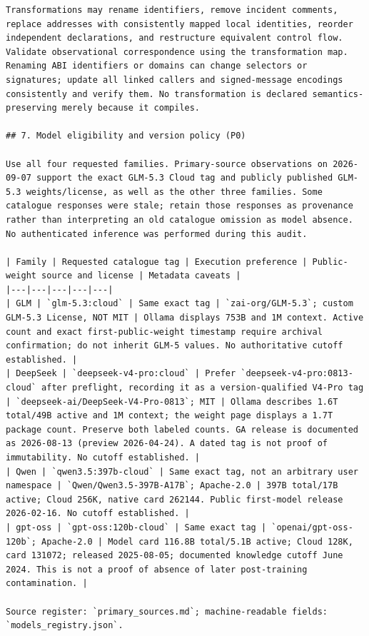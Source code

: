 \documentclass[11pt,a4paper]{article}
\begin{document}
\begin{verbatim}
Transformations may rename identifiers, remove incident comments, replace addresses with consistently mapped local identities, reorder independent declarations, and restructure equivalent control flow. Validate observational correspondence using the transformation map. Renaming ABI identifiers or domains can change selectors or signatures; update all linked callers and signed-message encodings consistently and verify them. No transformation is declared semantics-preserving merely because it compiles.

## 7. Model eligibility and version policy (P0)

Use all four requested families. Primary-source observations on 2026-09-07 support the exact GLM-5.3 Cloud tag and publicly published GLM-5.3 weights/license, as well as the other three families. Some catalogue responses were stale; retain those responses as provenance rather than interpreting an old catalogue omission as model absence. No authenticated inference was performed during this audit.

| Family | Requested catalogue tag | Execution preference | Public-weight source and license | Metadata caveats |
|---|---|---|---|---|
| GLM | `glm-5.3:cloud` | Same exact tag | `zai-org/GLM-5.3`; custom GLM-5.3 License, NOT MIT | Ollama displays 753B and 1M context. Active count and exact first-public-weight timestamp require archival confirmation; do not inherit GLM-5 values. No authoritative cutoff established. |
| DeepSeek | `deepseek-v4-pro:cloud` | Prefer `deepseek-v4-pro:0813-cloud` after preflight, recording it as a version-qualified V4-Pro tag | `deepseek-ai/DeepSeek-V4-Pro-0813`; MIT | Ollama describes 1.6T total/49B active and 1M context; the weight page displays a 1.7T package count. Preserve both labeled counts. GA release is documented as 2026-08-13 (preview 2026-04-24). A dated tag is not proof of immutability. No cutoff established. |
| Qwen | `qwen3.5:397b-cloud` | Same exact tag, not an arbitrary user namespace | `Qwen/Qwen3.5-397B-A17B`; Apache-2.0 | 397B total/17B active; Cloud 256K, native card 262144. Public first-model release 2026-02-16. No cutoff established. |
| gpt-oss | `gpt-oss:120b-cloud` | Same exact tag | `openai/gpt-oss-120b`; Apache-2.0 | Model card 116.8B total/5.1B active; Cloud 128K, card 131072; released 2025-08-05; documented knowledge cutoff June 2024. This is not a proof of absence of later post-training contamination. |

Source register: `primary_sources.md`; machine-readable fields: `models_registry.json`.


\end{verbatim}
\end{document}
